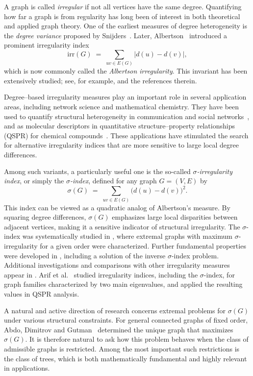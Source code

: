 \documentclass[preprint,12pt]{elsarticle}
\begin{document}
A graph is called \emph{irregular} if not all vertices have the same degree. 
Quantifying how far a graph is from regularity has long been of interest in both 
theoretical and applied graph theory. One of the earliest measures of degree 
heterogeneity is the \emph{degree variance} proposed by Snijders~\cite{Snijders1981}. 
Later, Albertson~\cite{Albertson1997} introduced a prominent irregularity index
\[
\mathrm{irr}(G) \;=\; \sum_{uv\in E(G)} \bigl| d(u)-d(v) \bigr|,
\]
which is now commonly called the \emph{Albertson irregularity}. 
This invariant has been extensively studied; see, for example, 
\cite{Albertson1997,Abdo2014,Hansen2005} and the references therein.

Degree–based irregularity measures play an important role in several application 
areas, including network science and mathematical chemistry. 
They have been used to quantify structural heterogeneity in communication and 
social networks~\cite{Estrada2010}, and as molecular descriptors in 
quantitative structure–property relationships (QSPR) for chemical 
compounds~\cite{Reti2018QSPR,Gutman2005}. 
These applications have stimulated the search for alternative irregularity 
indices that are more sensitive to large local degree differences.

Among such variants, a particularly useful one is the so-called 
\emph{$\sigma$-irregularity index}, or simply the \emph{$\sigma$-index}, defined 
for any graph $G=(V,E)$ by
\[
\sigma(G) \;=\; \sum_{uv\in E(G)} \bigl(d(u)-d(v)\bigr)^2 .
\]
This index can be viewed as a quadratic analog of Albertson’s measure. 
By squaring degree differences, $\sigma(G)$  emphasizes large local disparities 
between adjacent vertices, making it a sensitive indicator of structural 
irregularity. The $\sigma$-index was systematically studied in 
\cite{Abdo2018}, where extremal graphs with maximum $\sigma$-irregularity for a 
given order were characterized. 
Further fundamental properties were developed in \cite{Gutman2018}, including a 
solution of the inverse $\sigma$-index problem. 
Additional investigations and comparisons with other irregularity measures 
appear in \cite{Reti2019}. Arif et al.~\cite{Arif2023} studied irregularity indices, including the $\sigma$-index, for graph families characterized by two main eigenvalues, and applied the resulting values in QSPR analysis.

A natural and active direction of research concerns extremal problems for 
$\sigma(G)$ under various structural constraints. 
For general connected graphs of fixed order, Abdo, Dimitrov and Gutman~\cite{Abdo2018} 
determined the unique graph that maximizes $\sigma(G)$. 
It is therefore natural to ask how this problem behaves when the class of admissible 
graphs is restricted. Among the most important such restrictions is the class of trees, 
which is both mathematically fundamental and highly relevant in applications.
\end{document}
